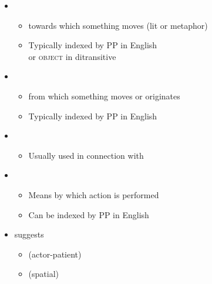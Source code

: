 \documentclass[headrule,footrule]{foils}
\begin{document}
\begin{itemize}
\item  {}
  \begin{itemize}
  \item  towards which something moves (lit or metaphor)
 \item  Typically indexed by  PP in English 
   \\ or \textsc{object} in ditransitive
  \end{itemize}
  \begin{exe}
  \ex{}
  \ex{}
  \end{exe}
\item  {}
 \begin{itemize}
 \item  from which something moves or originates
 \item  Typically indexed by  PP in English
 \end{itemize}
  \begin{exe}
 \ex{}  
\end{exe}
\newpage
\item  {}
  \begin{itemize}
  \item  Usually used in connection with 
  \end{itemize}
  \begin{exe}
  \ex{}
  \ex{}
\end{exe}
\item  {}
  \begin{itemize}
  \item  Means by which action is performed
  \item  Can be indexed by  PP in English
  \end{itemize}
  \begin{exe}
    \ex{}
  \end{exe}
\end{itemize}


\begin{itemize}
\item \citet{Jackendoff:1990} suggests
  \begin{itemize}
  \item {} (actor-patient)
    \\ 
  \item {} (spatial)
  \\ 
\end{itemize}
\end{itemize}
\end{document}
